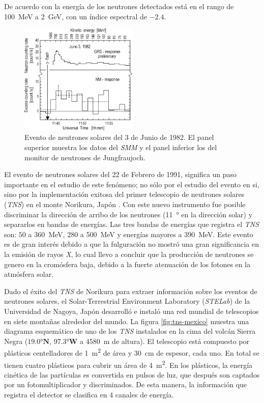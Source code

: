 De acuerdo con \cite{chupp87} la energía de los neutrones detectados está en el rango de \SI{100}{\mega\electronvolt} a \SI{2}{\giga\electronvolt}, con un índice espectral de $-2.4$.

\begin{figure}
        \centering
        \includegraphics[width=0.5\textwidth]{neutrons-ground.png}
        \caption{Evento de neutrones solares del \num{3} de Junio de \num{1982}. El panel superior muestra los datos del \emph{SMM} y el panel inferior los del monitor de neutrones de Jungfraujoch.}
        \label{fig:neutrons-ground}
\end{figure}

El evento de neutrones solares del \num{22} de Febrero de \num{1991}, significa un paso importante en el estudio de este fenómeno; no sólo por el estudio del evento en si, sino por la implementación exitosa del primer telescopio de neutrones solares (\emph{TNS}) en el monte Norikura, Japón \cite{muraki92}. Con este nuevo instrumento fue posible discriminar la dirección de arribo de los neutrones (\SI{11}{\degree} en la dirección solar) y separarlos en bandas de energías. Las tres bandas de energías que registra el \emph{TNS} son: $50$ a \SI{360}{\mega\electronvolt}, $280$ a \SI{500}{\mega\electronvolt} y energías mayores a \SI{390}{\mega\electronvolt}. Este evento es de gran interés debido a que la fulguración no mostró una gran significancia en la emisión de rayos \emph{X}, lo cual llevo a concluir que la producción de neutrones se genero en la cromósfera baja, debido a la fuerte atenuación de los fotones en la atmósfera solar.

Dado el éxito del \emph{TNS} de Norikura para extraer información sobre los eventos de neutrones solares, el Solar-Terrestrial Environment Laboratory (\emph{STELab}) de la Universidad de Nagoya, Japón desarrolló e instaló una red mundial de telescopios en siete montañas alrededor del mundo. La figura \ref{fig:tns-mexico} muestra una diagrama esquemático de uno de los \emph{TNS} instalados en la cima del volcán Sierra Negra ($\ang{19.0}\mathbf{N}$, $\ang{97.3}\mathbf{W}$ a \SI{4580}{\metre} de altura). El telescopio está compuesto por plásticos centelladores de \SI{1}{\square\metre} de área y \SI{30}{\centi\metre} de espesor, cada uno. En total se tienen cuatro plásticos para cubrir un área de \SI{4}{\square\metre}. En los plásticos, la energía cinética de las partículas es convertida en pulsos de luz, que después son captados por un fotomultiplicador y discriminados. De esta manera, la información que registra el detector se clasifica en \num{4} canales de energía\cite{valdes04}.

